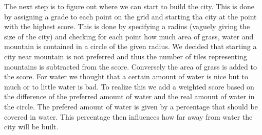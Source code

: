 \documentclass{scrartcl}
\begin{document}
The next step is to figure out where we can start to build the city. This is done
by assigning a grade to each point on the grid and starting tha city at the point
with the highest score. This is done by specifying a radius (vaguely giving
the size of the city) and checking for each point how much area of grass,
water and mountain is contained in a circle of the given radius.
We decided that starting a city near mountain is not preferred and thus the number
of tiles representing mountains is subtracted from the score. Conversely the area
of grass is added to the score. For water we thought that a certain amount of water
is nice but to much or to little water is bad. To realize this we add a weighted score based
on the difference of the preferred amount of water and the real amount of water in
the circle. The prefered amount of water is given by a percentage that should be
covered in water. This percentage then influences how far away from water the
city will be built.
\end{document}
